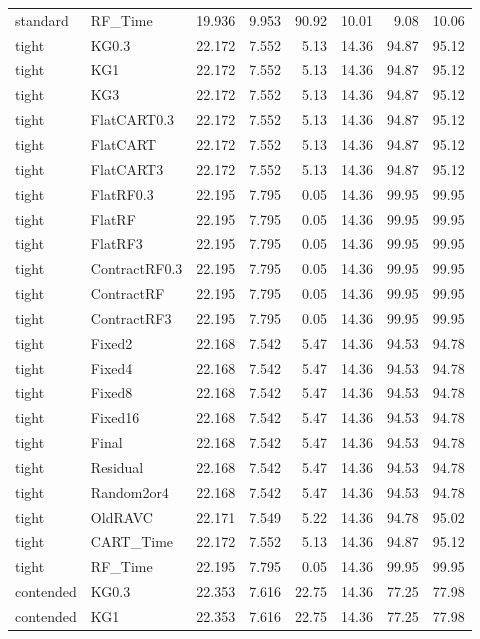 \begin{longtable}{@{}llrrrrrr@{}}
standard & RF\_Time & 19.936 & 9.953 & 90.92 & 10.01 & 9.08 & 10.06\\
tight & KG0.3 & 22.172 & 7.552 & 5.13 & 14.36 & 94.87 & 95.12\\
tight & KG1 & 22.172 & 7.552 & 5.13 & 14.36 & 94.87 & 95.12\\
tight & KG3 & 22.172 & 7.552 & 5.13 & 14.36 & 94.87 & 95.12\\
tight & FlatCART0.3 & 22.172 & 7.552 & 5.13 & 14.36 & 94.87 & 95.12\\
tight & FlatCART & 22.172 & 7.552 & 5.13 & 14.36 & 94.87 & 95.12\\
tight & FlatCART3 & 22.172 & 7.552 & 5.13 & 14.36 & 94.87 & 95.12\\
tight & FlatRF0.3 & 22.195 & 7.795 & 0.05 & 14.36 & 99.95 & 99.95\\
tight & FlatRF & 22.195 & 7.795 & 0.05 & 14.36 & 99.95 & 99.95\\
tight & FlatRF3 & 22.195 & 7.795 & 0.05 & 14.36 & 99.95 & 99.95\\
tight & ContractRF0.3 & 22.195 & 7.795 & 0.05 & 14.36 & 99.95 & 99.95\\
tight & ContractRF & 22.195 & 7.795 & 0.05 & 14.36 & 99.95 & 99.95\\
tight & ContractRF3 & 22.195 & 7.795 & 0.05 & 14.36 & 99.95 & 99.95\\
tight & Fixed2 & 22.168 & 7.542 & 5.47 & 14.36 & 94.53 & 94.78\\
tight & Fixed4 & 22.168 & 7.542 & 5.47 & 14.36 & 94.53 & 94.78\\
tight & Fixed8 & 22.168 & 7.542 & 5.47 & 14.36 & 94.53 & 94.78\\
tight & Fixed16 & 22.168 & 7.542 & 5.47 & 14.36 & 94.53 & 94.78\\
tight & Final & 22.168 & 7.542 & 5.47 & 14.36 & 94.53 & 94.78\\
tight & Residual & 22.168 & 7.542 & 5.47 & 14.36 & 94.53 & 94.78\\
tight & Random2or4 & 22.168 & 7.542 & 5.47 & 14.36 & 94.53 & 94.78\\
tight & OldRAVC & 22.171 & 7.549 & 5.22 & 14.36 & 94.78 & 95.02\\
tight & CART\_Time & 22.172 & 7.552 & 5.13 & 14.36 & 94.87 & 95.12\\
tight & RF\_Time & 22.195 & 7.795 & 0.05 & 14.36 & 99.95 & 99.95\\
contended & KG0.3 & 22.353 & 7.616 & 22.75 & 14.36 & 77.25 & 77.98\\
contended & KG1 & 22.353 & 7.616 & 22.75 & 14.36 & 77.25 & 77.98\\

\end{longtable}

